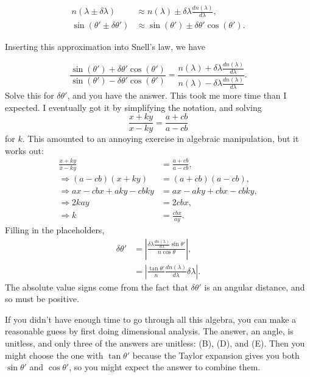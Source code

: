 \documentclass[11pt]{paper}
\begin{document}
\begin{align}
	n(\lambda \pm \delta\lambda)&\approx n(\lambda) \pm \delta\lambda \frac{d n(\lambda)}{d\lambda},\\
	\sin\left(\theta' \pm \delta\theta'\right)&\approx\sin(\theta') \pm \delta\theta'\cos(\theta').
\end{align}

Inserting this approximation into Snell's law, we have

\begin{equation}
	\frac{\sin(\theta') + \delta\theta'\cos(\theta')}{\sin(\theta') - \delta\theta'\cos(\theta')} = \frac{n(\lambda) + \delta\lambda \frac{d n(\lambda)}{d\lambda}}{n(\lambda) - \delta\lambda \frac{d n(\lambda)}{d\lambda}}.
\end{equation}
Solve this for $\delta\theta'$, and you have the answer.  This took me more time than I expected.  I eventually got it by simplifying the notation, and solving
\begin{equation}
	\frac{x+ky}{x-ky} = \frac{a+cb}{a-cb}
\end{equation}
for $k$.  This amounted to an annoying exercise in algebraic manipulation, but it works out:
\begin{align}
	\frac{x+ky}{x-ky} &= \frac{a+cb}{a-cb},\\
	\Rightarrow (a-cb)(x+ky) &= (a+cb)(a-cb),\\
	\Rightarrow ax - cbx + aky - cbky &= ax-aky+cbx-cbky,\\
	\Rightarrow 2kay &= 2cbx,\\
	\Rightarrow k &=\frac{cbx}{ay}. 
\end{align}
Filling in the placeholders,
\begin{align}
	\delta\theta' &= \left|\frac{\delta\lambda\frac{dn(\lambda)}{d\lambda}\sin\theta'}{n\cos\theta}\right|,\\
	&=\left|\frac{\tan\theta'}{n}\frac{dn(\lambda)}{d\lambda}\delta\lambda\right|.
\end{align}
The absolute value signs come from the fact that $\delta\theta'$ is an angular distance, and so must be positive.

If you didn't have enough time to go through all this algebra, you can make a reasonable guess by first doing dimensional analysis.  The answer, an angle, is unitless, and only three of the answers are unitless: (B), (D), and (E).  Then you might choose the one with $\tan\theta'$ because the Taylor expansion gives you both $\sin\theta'$ and $\cos\theta'$, so you might expect the answer to combine them.\\
\end{document}

